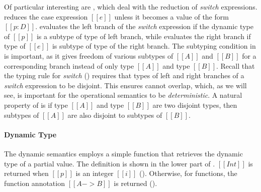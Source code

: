 Of particular interesting are
, which deal with the reduction
of \emph{switch} expressions.
 reduces the case expression $[[e]]$ unless it
becomes a value of the form $[[p:D]]$.  
 evaluates
the left branch of the \emph{switch} expression if the dynamic type of $[[p]]$ is
a subtype of type of left branch, while  evaluates the right
branch if type of $[[e]]$ is subtype
of type of the right branch. The subtyping condition in  is important, as it gives
freedom of various subtypes of $[[A]]$ and $[[B]]$ for a corresponding
branch instead of only type $[[A]]$ and type $[[B]]$. Recall that
the typing rule for \emph{switch} () requires that
types of left and right branches of a \emph{switch}
expression to be disjoint.
This ensures  cannot overlap, which, as we will
see, is important for the
operational semantics to be \textit{deterministic}.
A natural property of \cal is
if type $[[A]]$ and type $[[B]]$ are two disjoint types, then subtypes
of $[[A]]$ are also disjoint to subtypes of $[[B]]$.

\paragraph{Dynamic Type}  The dynamic semantics employs a simple
function that retrieves the dynamic type of a partial value. 
The definition
is shown in the lower part of .
$[[Int]]$ is returned when $[[p]]$ is an integer $[[i]]$ ().
Otherwise, for functions, the function annotation $[[A -> B]]$ is returned
().

